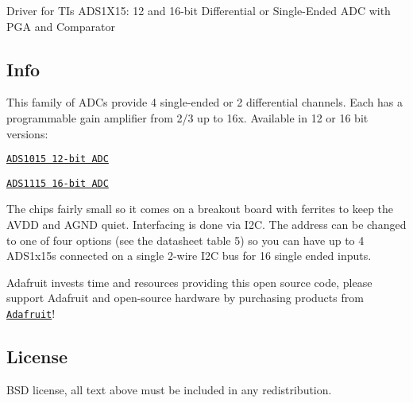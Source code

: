 Driver for TI\textquotesingle{}s A\+D\+S1\+X15\+: 12 and 16-\/bit Differential or Single-\/\+Ended A\+DC with P\+GA and Comparator

\subsection*{Info}

This family of A\+D\+Cs provide 4 single-\/ended or 2 differential channels. Each has a programmable gain amplifier from 2/3 up to 16x. Available in 12 or 16 bit versions\+:


\begin{DoxyItemize}
\item \href{https://www.adafruit.com/product/1083}{\tt A\+D\+S1015 12-\/bit A\+DC}
\item \href{https://www.adafruit.com/product/1085}{\tt A\+D\+S1115 16-\/bit A\+DC}
\end{DoxyItemize}

The chip\textquotesingle{}s fairly small so it comes on a breakout board with ferrites to keep the A\+V\+DD and A\+G\+ND quiet. Interfacing is done via I2C. The address can be changed to one of four options (see the datasheet table 5) so you can have up to 4 A\+D\+S1x15\textquotesingle{}s connected on a single 2-\/wire I2C bus for 16 single ended inputs.

Adafruit invests time and resources providing this open source code, please support Adafruit and open-\/source hardware by purchasing products from \href{https://www.adafruit.com}{\tt Adafruit}!

\subsection*{License}

B\+SD license, all text above must be included in any redistribution. 